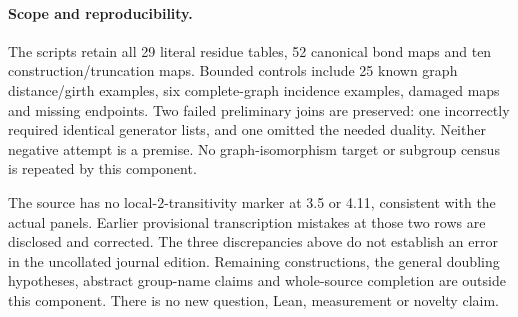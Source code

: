 \documentclass[10pt]{article}
\begin{document}
\paragraph{Scope and reproducibility.}
The scripts retain all 29 literal residue tables, 52 canonical bond maps and
ten construction/truncation maps.  Bounded controls include 25 known graph
distance/girth examples, six complete-graph incidence examples, damaged maps
and missing endpoints.  Two failed preliminary joins are preserved: one
incorrectly required identical generator lists, and one omitted the needed
duality.  Neither negative attempt is a premise.  No graph-isomorphism target
or subgroup census is repeated by this component.

The source has no local-$2$-transitivity marker at 3.5 or 4.11, consistent with
the actual panels.  Earlier provisional transcription mistakes at those two
rows are disclosed and corrected.  The three discrepancies above do not
establish an error in the uncollated journal edition.  Remaining constructions,
the general doubling hypotheses, abstract group-name claims and whole-source
completion are outside this component.  There is no new question, Lean,
measurement or novelty claim.
\end{document}
